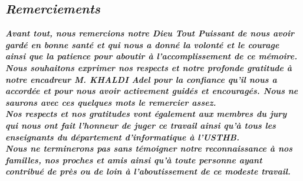 \begin{center}

\chapter*{\textit{Remerciements}}

\end{center}
	
	
	\textbf{\textit{Avant tout, nous remercions notre Dieu Tout Puissant de nous avoir gardé en bonne santé et qui nous a donné la volonté et le courage ainsi que la patience pour aboutir à l'accomplissement de ce mémoire.}}\\


	\textbf{\textit{Nous souhaitons exprimer nos respects et notre profonde gratitude à notre encadreur M. KHALDI Adel pour la confiance qu'il nous a accordée et pour nous avoir activement guidés et encouragés. Nous ne saurons avec ces quelques mots le remercier assez.}}\\



	\textbf{\textit{Nos respects et nos gratitudes vont également aux membres du jury qui nous ont fait l'honneur de juger ce travail ainsi  qu'à tous  les enseignants du département d'informatique à l'USTHB.}}\\


	\textbf{\textit{Nous ne terminerons pas sans témoigner notre reconnaissance à nos familles, nos proches et amis ainsi qu'à toute personne ayant contribué de près ou de loin à l'aboutissement de ce modeste travail.}}

